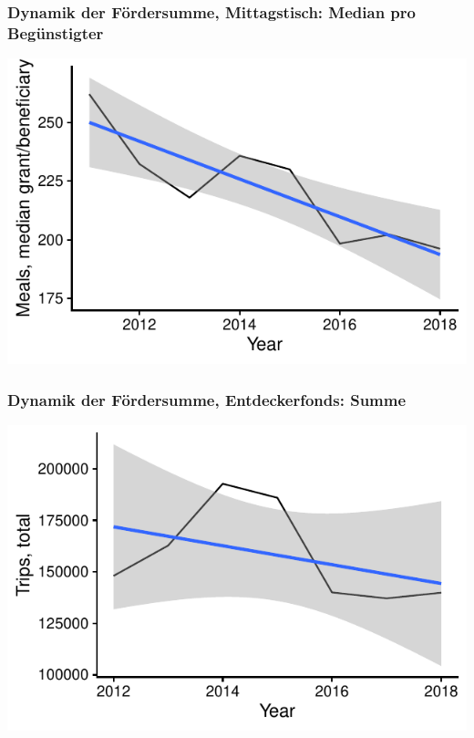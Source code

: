 \begin{frame}[fragile]
\frametitle{Dynamik der Fördersumme, Mittagstisch: Median pro Begünstigter}


{\centering \includegraphics[width=\maxwidth]{figure/beamer-FundamentalDynamicsMealsMedianPerBene-1} 

}



\end{frame}

\begin{frame}[fragile]
\frametitle{Dynamik der Fördersumme, Entdeckerfonds: Summe}



{\centering \includegraphics[width=\maxwidth]{figure/beamer-FundamentalDynamicsTripsTotal-1} 

}



\end{frame}

